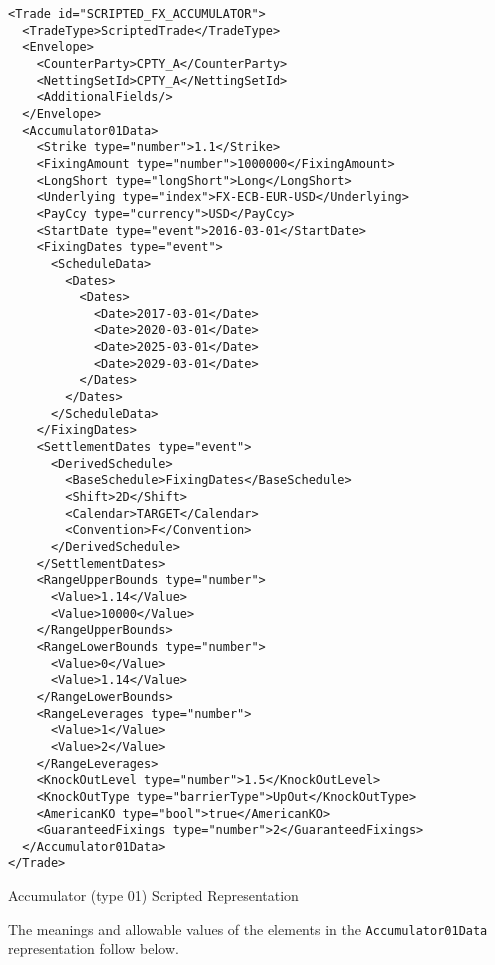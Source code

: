 \begin{listing}[H]
\begin{verbatim}
<Trade id="SCRIPTED_FX_ACCUMULATOR">
  <TradeType>ScriptedTrade</TradeType>
  <Envelope>
    <CounterParty>CPTY_A</CounterParty>
    <NettingSetId>CPTY_A</NettingSetId>
    <AdditionalFields/>
  </Envelope>
  <Accumulator01Data>
    <Strike type="number">1.1</Strike>
    <FixingAmount type="number">1000000</FixingAmount>
    <LongShort type="longShort">Long</LongShort>
    <Underlying type="index">FX-ECB-EUR-USD</Underlying>
    <PayCcy type="currency">USD</PayCcy>
    <StartDate type="event">2016-03-01</StartDate>
    <FixingDates type="event">
      <ScheduleData>
        <Dates>
          <Dates>
            <Date>2017-03-01</Date>
            <Date>2020-03-01</Date>
            <Date>2025-03-01</Date>
            <Date>2029-03-01</Date>
          </Dates>
        </Dates>
      </ScheduleData>
    </FixingDates>
    <SettlementDates type="event">
      <DerivedSchedule>
        <BaseSchedule>FixingDates</BaseSchedule>
        <Shift>2D</Shift>
        <Calendar>TARGET</Calendar>
        <Convention>F</Convention>
      </DerivedSchedule>
    </SettlementDates>
    <RangeUpperBounds type="number">
      <Value>1.14</Value>
      <Value>10000</Value>
    </RangeUpperBounds>
    <RangeLowerBounds type="number">
      <Value>0</Value>
      <Value>1.14</Value>
    </RangeLowerBounds>
    <RangeLeverages type="number">
      <Value>1</Value>
      <Value>2</Value>
    </RangeLeverages>
    <KnockOutLevel type="number">1.5</KnockOutLevel>
    <KnockOutType type="barrierType">UpOut</KnockOutType>
    <AmericanKO type="bool">true</AmericanKO>
    <GuaranteedFixings type="number">2</GuaranteedFixings>
  </Accumulator01Data>
</Trade>
\end{verbatim}
\caption{Accumulator (type 01) Scripted Representation}
\label{lst:fxaccumulator01}
\end{listing}

The meanings and allowable values of the elements in the \verb+Accumulator01Data+ representation follow below.

